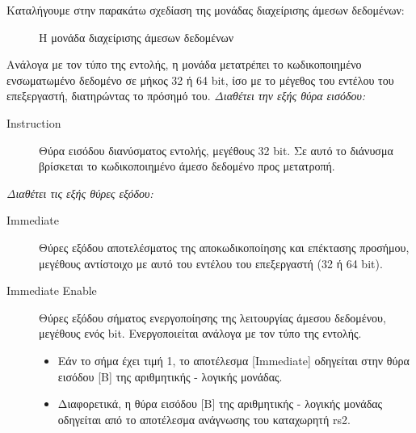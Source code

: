 \documentclass[11pt]{extarticle}
\begin{document}
Καταλήγουμε στην παρακάτω σχεδίαση της μονάδας διαχείρισης άμεσων δεδομένων: \newline
\begin{figure}[H]
    \centering
    \caption[Μονάδα Διαχείρισης Άμεσων Δεδομένων]{Η μονάδα διαχείρισης άμεσων δεδομένων}
\end{figure}
 Ανάλογα με τον τύπο της εντολής, η μονάδα μετατρέπει το κωδικοποιημένο ενσωματωμένο δεδομένο σε μήκος 32 ή 64 bit, ίσο με το μέγεθος του εντέλου του επεξεργαστή, διατηρώντας το πρόσημό του.
\vspace{1em}
\newline
\textit{Διαθέτει την εξής θύρα εισόδου:}
\begin{description}
 \item[Instruction] Θύρα εισόδου διανύσματος εντολής, μεγέθους 32 bit. \newline
 Σε αυτό το διάνυσμα βρίσκεται το κωδικοποιημένο άμεσο δεδομένο προς μετατροπή.
\end{description}
\newpage
\textit{Διαθέτει τις εξής θύρες εξόδου:}
\begin{description}
 \item[Immediate] Θύρες εξόδου αποτελέσματος της αποκωδικοποίησης και επέκτασης προσήμου, μεγέθους αντίστοιχο με αυτό του εντέλου του επεξεργαστή (32 ή 64 bit).
 \item[Immediate Enable] Θύρες εξόδου σήματος ενεργοποίησης της λειτουργίας άμεσου δεδομένου, μεγέθους ενός bit. \newline
 Ενεργοποιείται ανάλογα με τον τύπο της εντολής.
\begin{itemize} 
    \item Εάν το σήμα έχει τιμή 1, το αποτέλεσμα [Immediate] οδηγείται στην θύρα εισόδου [Β] της αριθμητικής - λογικής μονάδας.
    \item Διαφορετικά, η θύρα εισόδου [Β] της αριθμητικής - λογικής μονάδας οδηγείται από το αποτέλεσμα ανάγνωσης του καταχωρητή rs2.
\end{itemize}
\end{description}
\end{document}
